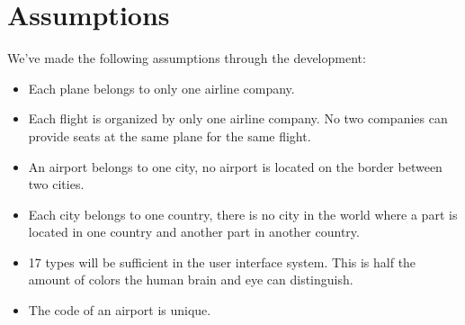 \section{Assumptions}
We've made the following assumptions through the development:
\begin{itemize}
 \item Each plane belongs to only one airline company.
 \item Each flight is organized by only one airline company. No two companies
can provide seats at the same plane for the same flight.
 \item An airport belongs to one city, no airport is located on the border
between two cities.
 \item Each city belongs to one country, there is no city in the world where a
part is located in one country and another part in another country.
 \item 17 types will be sufficient in the user interface system. This is half
the amount of colors the human brain and eye can distinguish.
\item The code of an airport is unique.
\end{itemize}